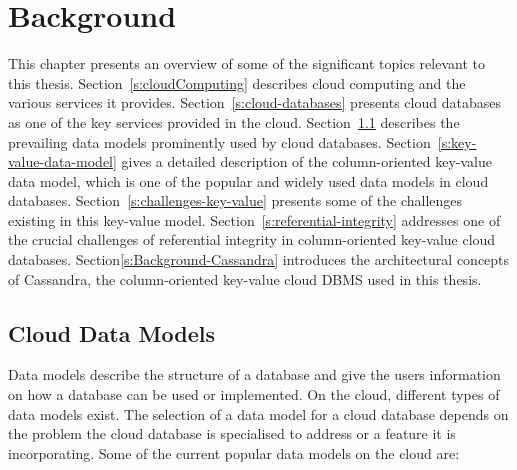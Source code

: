 \chapter{Background} \label{c:background}

This chapter  presents an overview of some of the significant topics relevant to
this thesis. Section~\ref{s:cloudComputing} describes cloud computing and the
various services it provides. Section~\ref{s:cloud-databases} presents cloud
databases as one of the key services provided in the cloud.
Section~\ref{s:cloud-data-models} describes the prevailing data models
prominently used by cloud databases. Section~\ref{s:key-value-data-model} gives
a detailed description of the column-oriented key-value data model, which is one
of the popular and widely used data models in cloud databases.
Section~\ref{s:challenges-key-value} presents some of the challenges existing in
this key-value model.
Section~\ref{s:referential-integrity} addresses one of the crucial challenges
of referential integrity in column-oriented key-value cloud databases.
Section\ref{s:Background-Cassandra} introduces the architectural concepts of
Cassandra, the column-oriented key-value cloud \ac{DBMS} used in this thesis.









\section{Cloud Data Models}\label{s:cloud-data-models}
Data models describe the structure of a database and give the users information
on how a database can be used or implemented.  On the cloud,   different types
of data models exist.  The selection of a data model for a cloud database
depends on the problem the cloud database is specialised to address or a feature
it is incorporating.  Some of the current popular data models on the cloud are:

